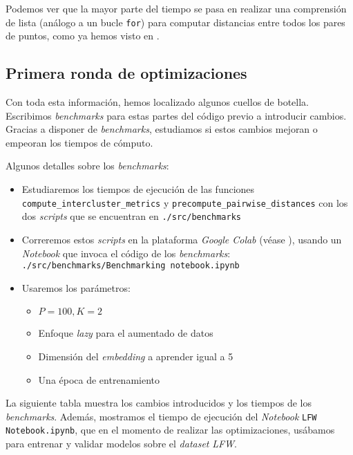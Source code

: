 Podemos ver que la mayor parte del tiempo se pasa en realizar una comprensión de lista (análogo a un bucle \lstinline{for}) para computar distancias entre todos los pares de puntos, como ya hemos visto en .

\subsection{Primera ronda de optimizaciones}

Con toda esta información, hemos localizado algunos cuellos de botella. Escribimos \textit{benchmarks} para estas partes del código previo a introducir cambios. Gracias a disponer de \textit{benchmarks}, estudiamos si estos cambios mejoran o empeoran los tiempos de cómputo.

Algunos detalles sobre los \textit{benchmarks}:

\begin{itemize}
    \item Estudiaremos los tiempos de ejecución de las funciones \lstinline{compute_intercluster_metrics} y \lstinline{precompute_pairwise_distances} con los dos \textit{scripts} que se encuentran en \lstinline{./src/benchmarks}
    \item Correremos estos \textit{scripts} en la plataforma \textit{Google Colab} (véase ), usando un \textit{Notebook} que invoca el código de los \textit{benchmarks}: \lstinline{./src/benchmarks/Benchmarking notebook.ipynb}
    \item Usaremos los parámetros:
        \begin{itemize}
            \item $P = 100, K = 2$
            \item Enfoque \textit{lazy} para el aumentado de datos
            \item Dimensión del \textit{embedding} a aprender igual a 5
            \item Una época de entrenamiento
        \end{itemize}
\end{itemize}

La siguiente tabla muestra los cambios introducidos y los tiempos de los \textit{benchmarks}. Además, mostramos el tiempo de ejecución del \textit{Notebook} \lstinline{LFW Notebook.ipynb}, que en el momento de realizar las optimizaciones, usábamos para entrenar y validar modelos sobre el \textit{dataset} \textit{LFW}.

